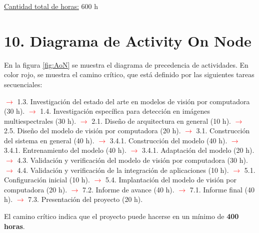 \documentclass[
11pt, %
]{charter}
\begin{document}
\underline{Cantidad total de horas:} 600 h

\section{10. Diagrama de Activity On Node}
\label{sec:AoN}

En la figura \ref{fig:AoN} se muestra el diagrama de precedencia de actividades. En color rojo, se muestra el camino crítico, que está definido por las siguientes tareas secuenciales:

\textcolor{red}{$\rightarrow$} 1.3. Investigación del estado del arte en modelos de visión por computadora (30 h).\newline
\textcolor{red}{$\rightarrow$} 1.4. Investigación específica para detección en imágenes multiespectrales (30 h).\newline
\textcolor{red}{$\rightarrow$} 2.1. Diseño de arquitectura en general (10 h).\newline
\textcolor{red}{$\rightarrow$} 2.5. Diseño del modelo de visión por computadora (20 h).\newline
\textcolor{red}{$\rightarrow$} 3.1. Construcción del sistema en general (40 h).\newline
\textcolor{red}{$\rightarrow$} 3.4.1. Construcción del modelo (40 h).\newline
\textcolor{red}{$\rightarrow$} 3.4.1. Entrenamiento del modelo (40 h).\newline
\textcolor{red}{$\rightarrow$} 3.4.1. Adaptación del modelo (20 h).\newline
\textcolor{red}{$\rightarrow$} 4.3. Validación y verificación del modelo de visión por computadora (30 h).\newline
\textcolor{red}{$\rightarrow$} 4.4. Validación y verificación de la integración de aplicaciones (10 h).\newline
\textcolor{red}{$\rightarrow$} 5.1. Configuración inicial (10 h).\newline
\textcolor{red}{$\rightarrow$} 5.4. Implantación del modelo de visión por computadora (20 h).\newline
\textcolor{red}{$\rightarrow$} 7.2. Informe de avance (40 h).\newline
\textcolor{red}{$\rightarrow$} 7.1. Informe final (40 h).\newline
\textcolor{red}{$\rightarrow$} 7.3. Presentación del proyecto (20 h).\newline


El camino crítico indica que el proyecto puede hacerse en un mínimo de \textbf{400 horas}.
\end{document}
